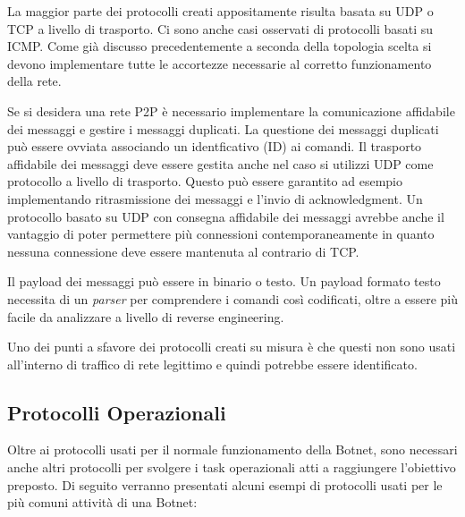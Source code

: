 La maggior parte dei protocolli creati appositamente risulta basata su UDP o TCP a livello di trasporto. Ci sono anche casi osservati di protocolli basati su ICMP. Come già discusso precedentemente a seconda della topologia scelta  si devono implementare tutte le accortezze necessarie al corretto funzionamento della rete. 

Se si desidera una rete P2P è necessario implementare la comunicazione affidabile dei messaggi e gestire i messaggi duplicati. La questione dei messaggi duplicati può essere ovviata associando un identficativo (ID) ai comandi.
Il trasporto affidabile dei messaggi deve essere gestita anche nel caso si utilizzi UDP come protocollo a livello di trasporto. Questo può essere garantito ad esempio implementando ritrasmissione dei messaggi e l'invio di acknowledgment.
Un protocollo basato su UDP con consegna affidabile dei messaggi avrebbe anche il vantaggio di poter permettere più connessioni contemporaneamente in quanto nessuna connessione deve essere mantenuta al contrario di TCP.

Il payload dei messaggi può essere in binario o testo. Un payload formato testo necessita di un \textit{parser} per comprendere i comandi così codificati, oltre a essere più facile da analizzare a livello di reverse engineering.

Uno dei punti a sfavore dei protocolli creati su misura è che questi non sono usati all'interno di traffico di rete legittimo e quindi potrebbe essere identificato.

\subsection{Protocolli Operazionali}
Oltre ai protocolli usati per il normale funzionamento della Botnet, sono necessari anche altri protocolli per svolgere i task operazionali atti a  raggiungere l'obiettivo preposto. 
Di seguito verranno presentati alcuni esempi di  protocolli usati per le più comuni attività  di una Botnet:

